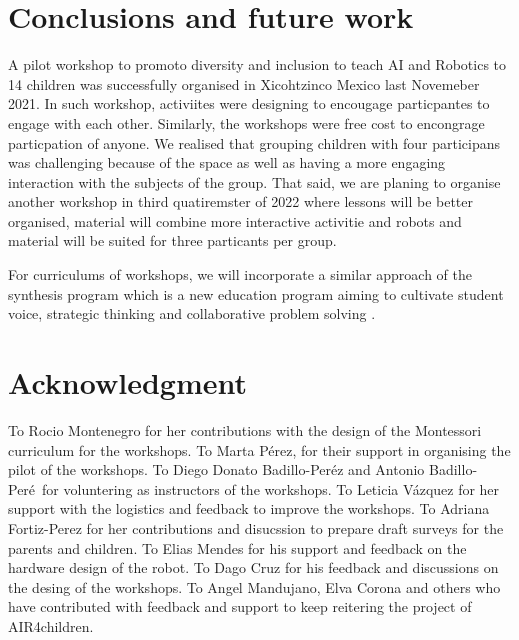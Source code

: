 \documentclass[conference]{IEEEtran}
\begin{document}
\section{Conclusions and future work}
A pilot workshop to promoto diversity and inclusion to teach AI and Robotics to 14 children was successfully organised in Xicohtzinco Mexico last Novemeber 2021.
In such workshop, activiites were designing to encougage particpantes to engage with each other. 
Similarly, the workshops were free cost to encongrage particpation of anyone. 
We realised that grouping children with four participans was challenging because of the space as well as having a more engaging interaction with the subjects of the group. 
That said, we are planing to organise another workshop in third quatiremster of 2022 where lessons will be better organised, material will combine more interactive activitie and robots and material will be suited for three particants per group. 

For curriculums of workshops, we will incorporate a similar approach of the synthesis program which is a new education program aiming to cultivate student voice, strategic thinking and collaborative problem solving \cite{synthesis2022}.


\section*{Acknowledgment}
To Rocio Montenegro for her contributions with the design of the Montessori curriculum for the workshops.
To Marta P\'erez, for their support in organising the pilot of the workshops.
To Diego Donato Badillo-Per\'ez and Antonio Badillo-Per\'e\ for voluntering as instructors of the workshops.
To Leticia V\'azquez for her support with the logistics and feedback to improve the workshops.
To Adriana Fortiz-Perez for her contributions and disucssion to prepare draft surveys for the parents and children. 
To Elias Mendes for his support and feedback on the hardware design of the robot.
To Dago Cruz for his feedback and discussions on the desing of the workshops.
To Angel Mandujano, Elva Corona and others who have contributed with feedback and support to keep reitering the project of AIR4children. 



\end{document}
